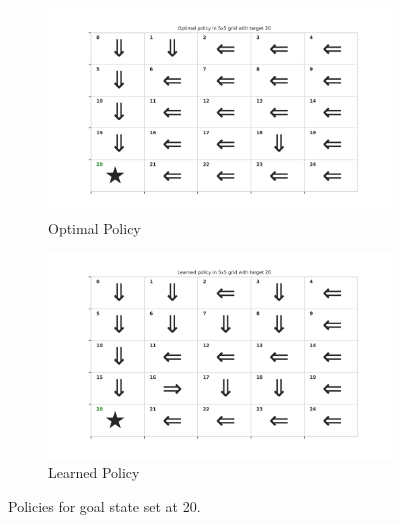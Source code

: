 \begin{figure}[!htbp]
    \centering
    \begin{subfigure}[b]{0.49\linewidth}
        \centering
        \includegraphics[width=\linewidth]{experimentation/images/Optimal policy in 5x5 grid with target 20.png}
        \caption{Optimal Policy}
    \end{subfigure}
    \begin{subfigure}[b]{0.49\linewidth}
        \centering
        \includegraphics[width=\linewidth]{experimentation/images/Learned policy in 5x5 grid with target 20.png}
        \caption{Learned Policy}
    \end{subfigure}
    \caption{Policies for goal state set at 20.}
    \label{fig:policy_20}
\end{figure}

\newpage
